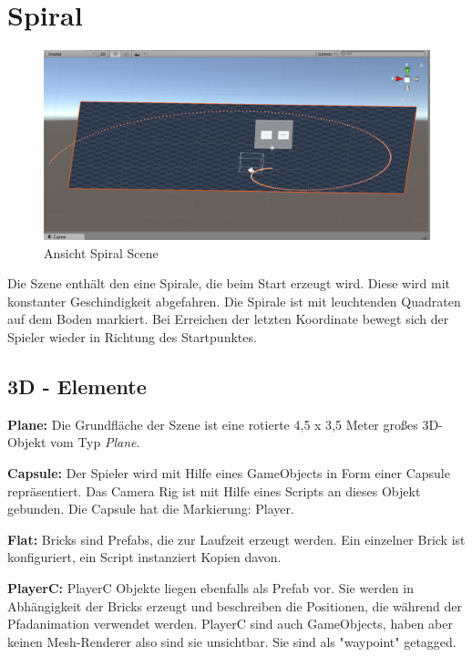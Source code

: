 \section{Spiral}
\label{Spirale}

\begin{figure}[h!]
	\includegraphics[scale=0.5]{bilder/spiralScene.png}
	\caption{Ansicht Spiral Scene}
\end{figure}


Die Szene enthält den eine Spirale, die beim Start erzeugt wird. Diese wird mit konstanter Geschindigkeit abgefahren. Die Spirale ist mit leuchtenden Quadraten auf dem Boden markiert. Bei Erreichen der letzten Koordinate bewegt sich der Spieler wieder in Richtung des Startpunktes. 

\subsection{3D - Elemente}

\textbf{Plane: } Die Grundfläche der Szene ist eine rotierte 4,5 x 3,5 Meter großes 3D-Objekt vom Typ \emph{Plane}.

\textbf{Capsule: } Der Spieler wird mit Hilfe eines GameObjects in Form einer Capsule repräsentiert. Das Camera Rig ist mit Hilfe eines Scripts an dieses Objekt gebunden. Die Capsule hat die Markierung: Player.

\textbf{Flat: } Bricks sind Prefabs, die zur Laufzeit erzeugt werden. Ein einzelner Brick ist konfiguriert, ein Script instanziert Kopien davon.

\textbf{PlayerC: } PlayerC Objekte liegen ebenfalls als Prefab vor. Sie werden in Abhängigkeit der Bricks erzeugt und beschreiben die Positionen, die während der Pfadanimation verwendet werden. PlayerC sind auch GameObjects, haben aber keinen Mesh-Renderer also sind sie unsichtbar. Sie sind als "waypoint" getagged.

